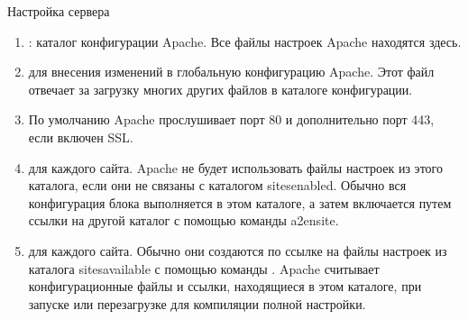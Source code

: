 \documentclass[a4paper,10pt,russian]{report}
\begin{document}
\sphinxAtStartPar
Настройка сервера
\begin{enumerate}
%
\item {} 
\sphinxAtStartPar
{}: каталог конфигурации Apache. Все файлы настроек Apache находятся здесь.

\item {} \begin{description}
\sphinxAtStartPar
для внесения изменений в глобальную конфигурацию Apache. Этот файл отвечает за загрузку
многих других файлов в каталоге конфигурации.

\end{description}

\item {} \begin{description}
\sphinxAtStartPar
По умолчанию Apache прослушивает порт 80 и дополнительно порт 443, если включен SSL.

\end{description}

\item {} \begin{description}
\sphinxAtStartPar
для каждого сайта. Apache не будет использовать файлы настроек из этого каталога,
если они не связаны с каталогом sites\sphinxhyphen{}enabled. Обычно вся конфигурация блока выполняется
в этом каталоге, а затем включается путем ссылки на другой каталог с помощью команды a2ensite.

\end{description}

\item {} \begin{description}
\sphinxAtStartPar
для каждого сайта. Обычно они создаются по ссылке на файлы настроек из каталога sites\sphinxhyphen{}available
с помощью команды . Apache считывает конфигурационные файлы и ссылки, находящиеся
в этом каталоге, при запуске или перезагрузке для компиляции полной настройки.


\end{description}
\end{enumerate}
\end{document}
